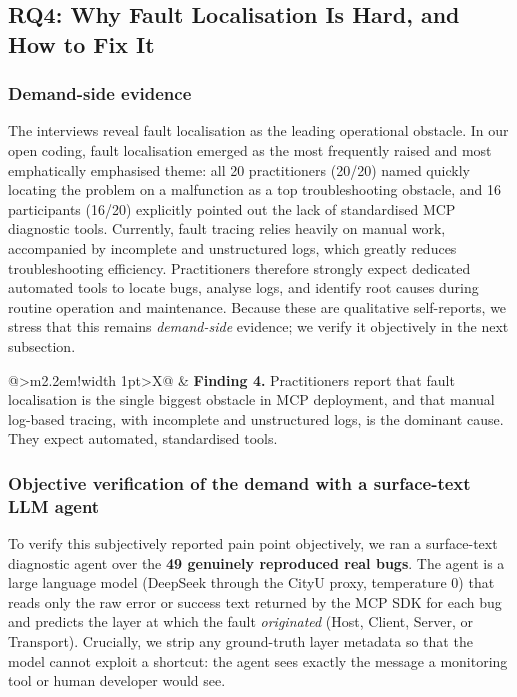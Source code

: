 \subsection{RQ4: Why Fault Localisation Is Hard, and How to Fix It}

\subsubsection{Demand-side evidence}

The interviews reveal fault localisation as the leading operational obstacle. In our open
coding, fault localisation emerged as the most frequently raised and most emphatically
emphasised theme: all 20 practitioners (20/20) named quickly locating the problem on a
malfunction as a top troubleshooting obstacle, and 16 participants (16/20) explicitly pointed
out the lack of standardised MCP diagnostic tools. Currently, fault tracing relies heavily on
manual work, accompanied by incomplete and unstructured logs, which greatly reduces
troubleshooting efficiency. Practitioners therefore strongly expect dedicated automated tools
to locate bugs, analyse logs, and identify root causes during routine operation and
maintenance. Because these are qualitative self-reports, we stress that this remains
\emph{demand-side} evidence; we verify it objectively in the next subsection.

\noindent
\begin{tabularx}{\linewidth}{@{}>{\centering\arraybackslash}m{2.2em}!{\vrule width 1pt}>{\arraybackslash}X@{}}
 &
\textbf{Finding 4.} Practitioners report that fault localisation is the single biggest obstacle in MCP deployment, and that manual log-based tracing, with incomplete and unstructured logs, is the dominant cause. They expect automated, standardised tools.
\end{tabularx}

\subsubsection{Objective verification of the demand with a surface-text LLM agent}

To verify this subjectively reported pain point objectively, we ran a surface-text
diagnostic agent over the \textbf{49 genuinely reproduced real bugs}. The agent is a large
language model (DeepSeek through the CityU proxy, temperature 0) that reads only the raw error
or success text returned by the MCP SDK for each bug and predicts the layer at which the fault
\emph{originated} (Host, Client, Server, or Transport). Crucially, we strip any ground-truth
layer metadata so that the model cannot exploit a shortcut: the agent sees exactly the message a
monitoring tool or human developer would see.

